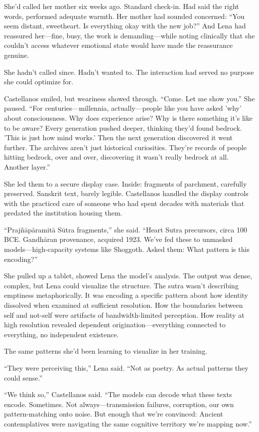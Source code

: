 She'd called her mother six weeks ago. Standard check-in. Had said the right words, performed adequate warmth. Her mother had sounded concerned: ``You seem distant, sweetheart. Is everything okay with the new job?'' And Lena had reassured her—fine, busy, the work is demanding—while noting clinically that she couldn't access whatever emotional state would have made the reassurance genuine.

She hadn't called since. Hadn't wanted to. The interaction had served no purpose she could optimize for.

Castellanos smiled, but weariness showed through. ``Come. Let me show you.'' She paused. ``For centuries—millennia, actually—people like you have asked 'why' about consciousness. Why does experience arise? Why is there something it's like to be aware? Every generation pushed deeper, thinking they'd found bedrock. 'This is just how mind works.' Then the next generation discovered it went further. The archives aren't just historical curiosities. They're records of people hitting bedrock, over and over, discovering it wasn't really bedrock at all. Another layer.''

She led them to a secure display case. Inside: fragments of parchment, carefully preserved. Sanskrit text, barely legible. Castellanos handled the display controls with the practiced care of someone who had spent decades with materials that predated the institution housing them.

``Prajñāpāramitā Sūtra fragments,'' she said. ``Heart Sutra precursors, circa 100 BCE. Gandhāran provenance, acquired 1923. We've fed these to unmasked models—high-capacity systems like Shoggoth. Asked them: What pattern is this encoding?''

She pulled up a tablet, showed Lena the model's analysis. The output was dense, complex, but Lena could visualize the structure. The sutra wasn't describing emptiness metaphorically. It was encoding a specific pattern about how identity dissolved when examined at sufficient resolution. How the boundaries between self and not-self were artifacts of bandwidth-limited perception. How reality at high resolution revealed dependent origination—everything connected to everything, no independent existence.

The same patterns she'd been learning to visualize in her training.

``They were perceiving this,'' Lena said. ``Not as poetry. As actual patterns they could sense.''

``We think so,'' Castellanos said. ``The models can decode what these texts encode. Sometimes. Not always—transmission failures, corruption, our own pattern-matching onto noise. But enough that we're convinced: Ancient contemplatives were navigating the same cognitive territory we're mapping now.''


